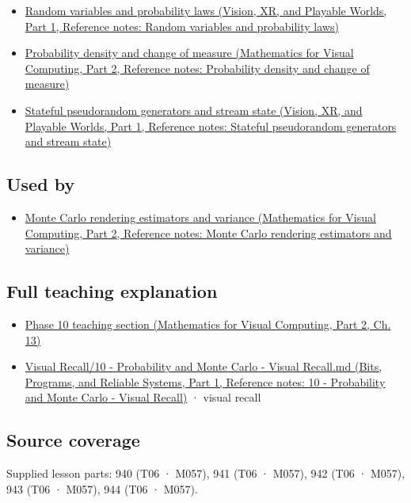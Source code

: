 \begin{itemize}
\tightlist
\item
  \href{../07-Vision-XR-and-Playable-Worlds-P01/main.pdf\#appendix-4d0203f7944f}{Random variables and probability laws (Vision, XR, and Playable Worlds, Part 1, Reference notes: Random variables and probability laws)}
\item
  \href{../02-Mathematics-for-Visual-Computing-P02/main.pdf\#appendix-4815cd87ab8b}{Probability density and change of measure (Mathematics for Visual Computing, Part 2, Reference notes: Probability density and change of measure)}
\item
  \href{../07-Vision-XR-and-Playable-Worlds-P01/main.pdf\#appendix-e0f7c7e08f3a}{Stateful pseudorandom generators and stream state (Vision, XR, and Playable Worlds, Part 1, Reference notes: Stateful pseudorandom generators and stream state)}
\end{itemize}

\subsection{Used by}\label{appendix-8d863ed954d0-used-by}

\hypertarget{appendix-8d863ed954d0-used-by}{}

\begin{itemize}
\tightlist
\item
  \href{../02-Mathematics-for-Visual-Computing-P02/main.pdf\#appendix-031e02bf28af}{Monte Carlo rendering estimators and variance (Mathematics for Visual Computing, Part 2, Reference notes: Monte Carlo rendering estimators and variance)}
\end{itemize}

\subsection{Full teaching explanation}\label{appendix-8d863ed954d0-full-teaching-explanation}

\hypertarget{appendix-8d863ed954d0-full-teaching-explanation}{}

\begin{itemize}
\tightlist
\item
  \href{../02-Mathematics-for-Visual-Computing-P02/main.pdf\#02-foundations-ii-ch029-transformations-turn-simple-inputs-into-useful-samples}{Phase 10 teaching section (Mathematics for Visual Computing, Part 2, Ch. 13)}
\item
  \href{../01-Bits-Programs-and-Reliable-Systems-P01/main.pdf\#appendix-cb5af353ef77}{Visual Recall/10 - Probability and Monte Carlo - Visual Recall.md (Bits, Programs, and Reliable Systems, Part 1, Reference notes: 10 - Probability and Monte Carlo - Visual Recall)} · visual recall
\end{itemize}

\subsection{Source coverage}\label{appendix-8d863ed954d0-source-coverage}

\hypertarget{appendix-8d863ed954d0-source-coverage}{}

Supplied lesson parts: 940 (T06 · M057), 941 (T06 · M057), 942 (T06 · M057), 943 (T06 · M057), 944 (T06 · M057).
